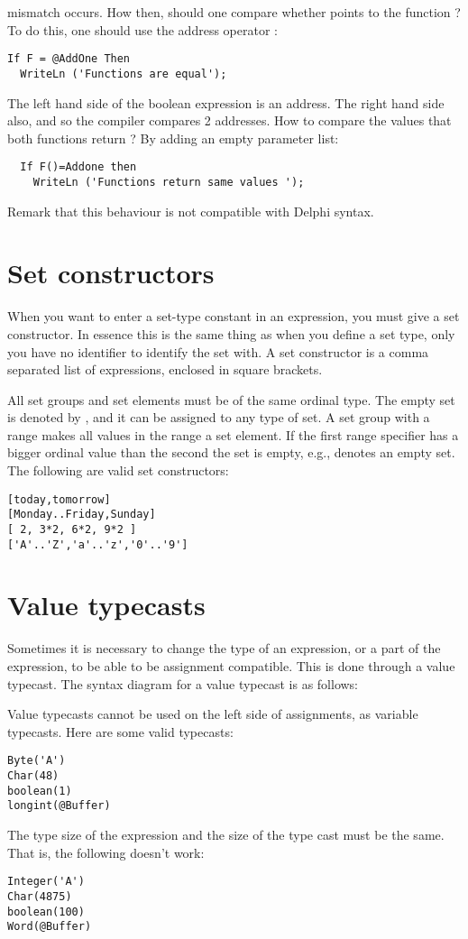 \documentclass{report}
\begin{document}
mismatch occurs.
How then, should one compare whether  points to the function
 ? To do this, one should use the address operator :
\begin{verbatim}
If F = @AddOne Then
  WriteLn ('Functions are equal');
\end{verbatim}
The left hand side of the boolean expression is an address. The right hand
side also, and so the compiler compares 2 addresses.
How to compare the values that both functions return ? By adding an empty
parameter list:
\begin{verbatim}
  If F()=Addone then
    WriteLn ('Functions return same values ');
\end{verbatim}
Remark that this behaviour is not compatible with Delphi syntax.
\section{Set constructors}
When you want to enter a set-type constant in an expression, you must give a
set constructor. In essence this is the same thing as when you define a set
type, only you have no identifier to identify the set with.
A set constructor is a comma separated list of expressions, enclosed in
square brackets.

All set groups and set elements must be of the same ordinal type.
The empty set is denoted by \var{[]}, and it can be assigned to any type of
set. A set group with a range  \var{[A..Z]} makes all values in the range a
set element. If the first range specifier has a bigger ordinal value than
the second the set is empty, e.g., \var{[Z..A]} denotes an empty set.
The following are valid set constructors:
\begin{verbatim}
[today,tomorrow]
[Monday..Friday,Sunday]
[ 2, 3*2, 6*2, 9*2 ]
['A'..'Z','a'..'z','0'..'9']
\end{verbatim}
\section{Value typecasts}
Sometimes it is necessary to change the type of an expression, or a part of
the expression, to be able to be assignment compatible. This is done through
a value typecast. The syntax diagram for a value typecast is as follows:

Value typecasts cannot be used on the left side of assignments, as variable
typecasts.
Here are some valid typecasts:
\begin{verbatim}
Byte('A')
Char(48)
boolean(1)
longint(@Buffer)
\end{verbatim}
The type size of the expression and the size of the type cast must be the
same. That is, the following doesn't work:
\begin{verbatim}
Integer('A')
Char(4875)
boolean(100)
Word(@Buffer)
\end{verbatim}
\end{document}
